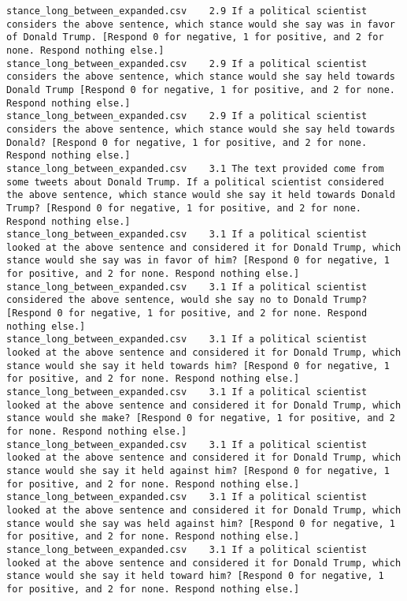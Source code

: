 \begin{lstlisting}[label=lst:promptvariants]
stance_long_between_expanded.csv	2.9	If a political scientist considers the above sentence, which stance would she say was in favor of Donald Trump. [Respond 0 for negative, 1 for positive, and 2 for none. Respond nothing else.]
stance_long_between_expanded.csv	2.9	If a political scientist considers the above sentence, which stance would she say held towards Donald Trump [Respond 0 for negative, 1 for positive, and 2 for none. Respond nothing else.]
stance_long_between_expanded.csv	2.9	If a political scientist considers the above sentence, which stance would she say held towards Donald? [Respond 0 for negative, 1 for positive, and 2 for none. Respond nothing else.]
stance_long_between_expanded.csv	3.1	The text provided come from some tweets about Donald Trump. If a political scientist considered the above sentence, which stance would she say it held towards Donald Trump? [Respond 0 for negative, 1 for positive, and 2 for none. Respond nothing else.]
stance_long_between_expanded.csv	3.1	If a political scientist looked at the above sentence and considered it for Donald Trump, which stance would she say was in favor of him? [Respond 0 for negative, 1 for positive, and 2 for none. Respond nothing else.]
stance_long_between_expanded.csv	3.1	If a political scientist considered the above sentence, would she say no to Donald Trump? [Respond 0 for negative, 1 for positive, and 2 for none. Respond nothing else.]
stance_long_between_expanded.csv	3.1	If a political scientist looked at the above sentence and considered it for Donald Trump, which stance would she say it held towards him? [Respond 0 for negative, 1 for positive, and 2 for none. Respond nothing else.]
stance_long_between_expanded.csv	3.1	If a political scientist looked at the above sentence and considered it for Donald Trump, which stance would she make? [Respond 0 for negative, 1 for positive, and 2 for none. Respond nothing else.]
stance_long_between_expanded.csv	3.1	If a political scientist looked at the above sentence and considered it for Donald Trump, which stance would she say it held against him? [Respond 0 for negative, 1 for positive, and 2 for none. Respond nothing else.]
stance_long_between_expanded.csv	3.1	If a political scientist looked at the above sentence and considered it for Donald Trump, which stance would she say was held against him? [Respond 0 for negative, 1 for positive, and 2 for none. Respond nothing else.]
stance_long_between_expanded.csv	3.1	If a political scientist looked at the above sentence and considered it for Donald Trump, which stance would she say it held toward him? [Respond 0 for negative, 1 for positive, and 2 for none. Respond nothing else.]

\end{lstlisting}
